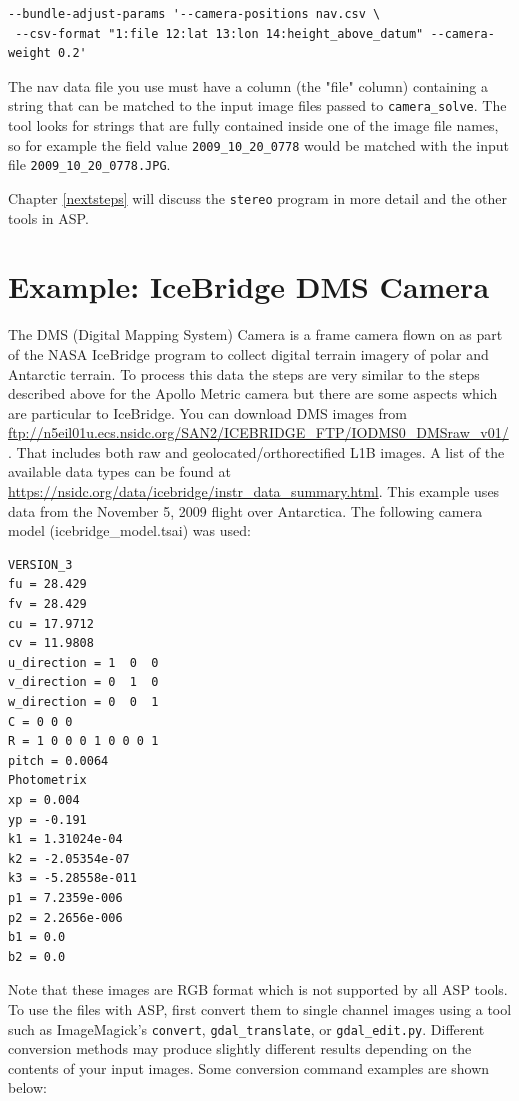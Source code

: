 \begin{verbatim}
--bundle-adjust-params '--camera-positions nav.csv \
 --csv-format "1:file 12:lat 13:lon 14:height_above_datum" --camera-weight 0.2'
\end{verbatim}

The nav data file you use must have a column (the "file" column) containing a string that can be matched to the
input image files passed to \texttt{camera\_solve}.  The tool looks for strings that are fully contained
inside one of the image file names, so for example the field value \texttt{2009\_10\_20\_0778} would be
matched with the input file \texttt{2009\_10\_20\_0778.JPG}.

Chapter \ref{nextsteps} will discuss the \texttt{stereo} program in more
detail and the other tools in ASP.

\section{Example: IceBridge DMS Camera}
\label{sfm:icebridge}


The DMS (Digital Mapping System) Camera is a frame camera flown on as part of the NASA
IceBridge program to collect digital terrain imagery of polar and Antarctic terrain.  To process this
data the steps are very similar to the steps described above for the Apollo Metric camera but there
are some aspects which are particular to IceBridge.  You can download DMS images from
\url{ftp://n5eil01u.ecs.nsidc.org/SAN2/ICEBRIDGE_FTP/IODMS0_DMSraw_v01/}.
That includes both raw and geolocated/orthorectified L1B images. A list of
the available data types can be found at \url{https://nsidc.org/data/icebridge/instr_data_summary.html}.
This example uses data from the November 5, 2009 flight over Antarctica. 
The following camera model (icebridge\_model.tsai) was used:

\begin{verbatim}
VERSION_3
fu = 28.429
fv = 28.429
cu = 17.9712
cv = 11.9808
u_direction = 1  0  0
v_direction = 0  1  0
w_direction = 0  0  1
C = 0 0 0
R = 1 0 0 0 1 0 0 0 1
pitch = 0.0064
Photometrix
xp = 0.004
yp = -0.191
k1 = 1.31024e-04
k2 = -2.05354e-07
k3 = -5.28558e-011
p1 = 7.2359e-006
p2 = 2.2656e-006
b1 = 0.0
b2 = 0.0
\end{verbatim}

Note that these images are RGB format which is not supported by all ASP tools.  
To use the files with ASP, first convert them to single channel images using 
a tool such as ImageMagick's \texttt{convert}, \texttt{gdal\_translate}, or 
\texttt{gdal\_edit.py}. Different conversion methods may produce slightly different
results depending on the contents of your input images.
Some conversion command examples are shown below:

